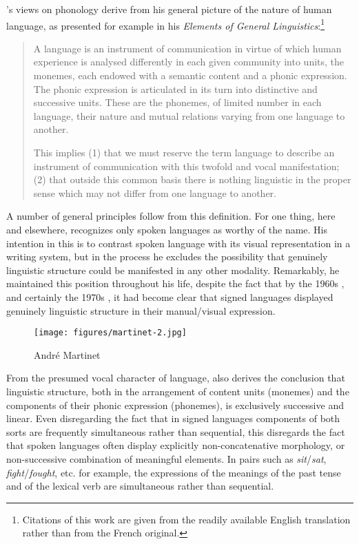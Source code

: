 {\Martinet}'s views on phonology derive from his general picture of the
nature of human language, as presented for example in his
\textsl{Elements of General Linguistics}:\footnote{Citations of this
work are given from the readily available {English} translation rather
than from the {French} original.}
\begin{quotation}
  A language is an instrument of communication in virtue of which
  human experience is analysed differently in each given community
  into units, the monemes, each endowed with a semantic content and a
  phonic expression. The phonic expression is articulated in its turn
  into distinctive and successive units. These are the phonemes, of
  limited number in each language, their nature and mutual relations
  varying from one language to another.

  This implies (1) that we must reserve the term language to describe
  an instrument of communication with this twofold  and
  vocal manifestation; (2) that outside this common basis there is
  nothing linguistic in the proper sense which may not differ from one
  language to another.\\
  \citep[29]{martinet64:elements}
\end{quotation}

A number of general principles follow from this definition. For one
thing, here and elsewhere, {\Martinet} recognizes only spoken languages
as worthy of the name. His intention in this is to {contrast} spoken
language with its visual representation in a writing system, but in
the process he excludes the possibility that genuinely linguistic
structure could be manifested in any other modality. Remarkably, he
maintained this position throughout his life, despite the fact that by
the 1960s \citep{stokoe:sign}, and certainly the 1970s
\citep{klima:bellugi:signs}, it had become clear that signed languages
displayed genuinely linguistic structure in their manual/visual
expression.

\begin{wrapfigure}{r}{.35\textwidth}
  \texttt{[image: figures/martinet-2.jpg]}
  \caption{André Martinet}
  \label{fig:ch.martinet.martinet2}
\end{wrapfigure}
From the presumed vocal character of language, {\Martinet} also derives
the conclusion that linguistic structure, both in the arrangement of
content units (monemes) and the components of their phonic expression
(phonemes), is exclusively successive and linear. Even disregarding
the fact that in signed languages components of both sorts are
frequently simultaneous rather than sequential, this disregards the
fact that spoken languages often display explicitly non-concatenative
morphology, or non-successive combination of meaningful elements. In
 pairs such as \emph{sit}/\emph{sat},
\emph{fight}/\emph{fought}, etc. for example, the expressions
of the meanings of the past tense and of the lexical verb are
simultaneous rather than sequential.

